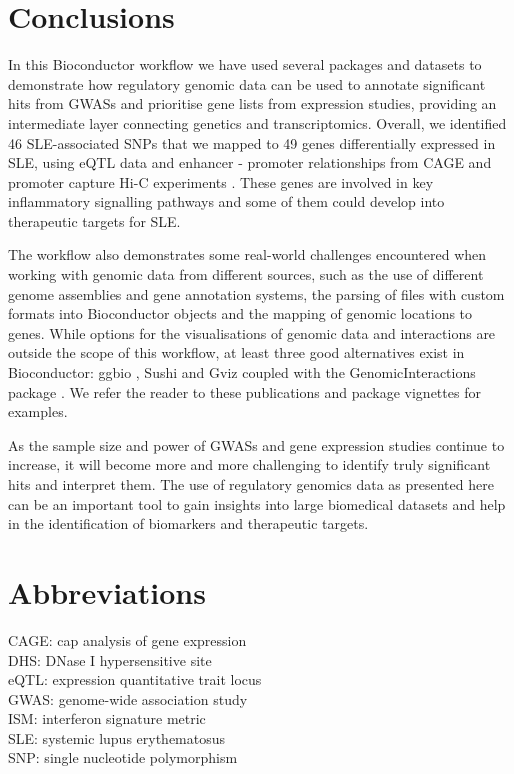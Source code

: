 \documentclass[9pt,a4paper,]{extarticle}
\theoremstyle{definition}
\theoremstyle{definition}
\theoremstyle{definition}
\theoremstyle{remark}
\begin{document}
\section{Conclusions}\label{conclusions}

In this Bioconductor workflow we have used several packages and datasets to demonstrate how regulatory genomic data can be used to annotate significant hits from GWASs and prioritise gene lists from expression studies, providing an intermediate layer connecting genetics and transcriptomics.
Overall, we identified 46 SLE-associated SNPs that we mapped to 49 genes differentially expressed in SLE, using eQTL data \citep{GTEx2017} and enhancer - promoter relationships from CAGE \citep{Fantom2014} and promoter capture Hi-C experiments \citep{Javierre2016}.
These genes are involved in key inflammatory signalling pathways and some of them could develop into therapeutic targets for SLE.

The workflow also demonstrates some real-world challenges encountered when working with genomic data from different sources, such as the use of different genome assemblies and gene annotation systems, the parsing of files with custom formats into Bioconductor objects and the mapping of genomic locations to genes.
While options for the visualisations of genomic data and interactions are outside the scope of this workflow, at least three good alternatives exist in Bioconductor: ggbio \citep{Yin2012}, Sushi \citep{Phanstiel2014} and Gviz \citep{Hahne2016} coupled with the GenomicInteractions package \citep{Harmston2015}.
We refer the reader to these publications and package vignettes for examples.

As the sample size and power of GWASs and gene expression studies continue to increase, it will become more and more challenging to identify truly significant hits and interpret them.
The use of regulatory genomics data as presented here can be an important tool to gain insights into large biomedical datasets and help in the identification of biomarkers and therapeutic targets.

\section{Abbreviations}\label{abbreviations}

CAGE: cap analysis of gene expression\\
DHS: DNase I hypersensitive site\\
eQTL: expression quantitative trait locus\\
GWAS: genome-wide association study\\
ISM: interferon signature metric\\
SLE: systemic lupus erythematosus\\
SNP: single nucleotide polymorphism
\end{document}
